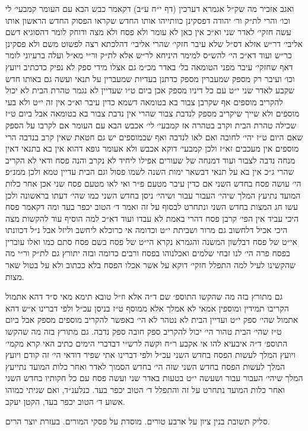 \documentclass[12pt, openany]{book}
\begin{document}
\begin{multicols}{2}
ואגב אזכיר מה שק״ל אגמרא דערכין (דף י״ח ע״ב) דקאמר כבש הבא עם העומר קמבעי׳ לי וכו׳ והרי לת״ק ור׳ יהודה דפסקינן כוותייהו אותו החדש שקראו הפסוק החדש הראשון אותו עשה חזקי׳ לאדר שני וא״כ אין כאן לא עומר ולא פסח ולא מצה ודוחק לומר דהסוגיא דשם אליבי׳ דר״ש אזלא דס״ל שלא עיבר חזקי׳ שהרי אליבי׳ דהלכתא רצה לפשוט משם ולא פסקינן כר״ש ועוד דא״כ הי׳ להש״ס למימר היניחא לר״ש אלא לת״ק ור״י מא״ל ועלה ברעיוני לומר דאף שחזקי׳ עיבר מפני הטומאה בל׳ באדר מכ״מ גם אצלו מידי ספק לא נפיק כדכתיב ויועץ וכו׳ ועיבר רק מספק שמעברין מספק כדתנן בעדיות שמעברין על תנאי ועשה גם באותו חדש שקבע לאדר שני י״ט עם כל דיניו מספק אכן ביום ט״ו שעדיין לא נגמר טהרת הבית לא יכול להקריב מוספים אף שקרבן צבור בא בטומאה דשמא כדין עיבר וא״כ אין זה י״ט ולא בעי מוספים ולא שייך שיקריב מספק לנדבת צבור שהרי אין נדבת צבור בא בטומאה אבל ביום ט״ז שכילה טהרת הבית וקרב בטהרה אז קמבעי׳ לי׳ אכבש הבא עם העומר אם לקרבו על הספק שאם היום ט״ז יהי׳ לחובה ואם לאו לנדבה ואף שבמוספים יש גם חטאת שאין קרב בנדבה הרי מוספים אין מעכבים זא״ז ולכן קמבעי׳ דוקא אכבש ולא אעומר גופא דהוא אין בא בתנאי דאין מנחה נדבה לצבור ועוד דמנחה של שעורים אפילו ליחיד לא נקרב והנה פסח ודאי לא הקריב שהרי ג״כ אין בא על תנאי דבשאר ימות השנה לשמו פסול וגם הבית עדיין טמא ולכן ממנ״פ הי׳ עושה פסח בחדש השני אם כדין עיבר מטעם פ״ר ואי לאו מטעם פסח שני אכן אחר כלות המועד נתיעץ המלך שיהי׳ העבור עבור ושיהי׳ ניסן בחדש השני כמו שהי׳ דעתו בראשונה ולכן עשו חג המצות בחדש השני ונתחרט לבסוף על זה ואמר ד׳ הטוב יכפר בעד ומה דקאמר פסח היכי עביד אין הפי׳ קרבן פסח דהרי באמת לא עבדו ועוד דא״כ למה הוסיף עוד להקשות מצה היכי אכיל דלחשוב גם מרור ושביתת י״ט וכדומה אי כרוכלא ליחשב וליזל אבל נ״ל דכוונתו אי״ט של פסח דבלשון המשנה והגמרא נקרא הי״ט של פסח בשם פסח סתם כמו ואלו עוברין בפסח פרה הי׳ לנו זבחי שלמים ואכלנוהו בפסח ורבים כדומה ובזה יתורץ גם לת״ק ור״י מה שהקשינו לעיל למה התפלל חזקי׳ דוקא על אשר אכלו הפסח בלא ככתוב ולא על בטול שאר מצות.\\\vspace{0pt}

גם מתורץ בזה מה שהקשו התוספ׳ שם ד״ה אלא וז״ל טובא תימא מאי ס״ד דהא אתמול הקריבו תמידין ומוספין אמאי לא אמלך אלא ממוסף ט״ז בניסן עכ״ל ולפי דברינו א״ש דהא אתמול שהי׳ ספק י״ט ועדיין הבית לא נטהר לא הי׳ באפשר להקריב מוספים מספק אבל ביום ט״ז שהי׳ הבית טהור הי׳ יכול להקריב ספק חובה ספק נדבה. גם מתורץ בזה מה שהקשו התוספ׳ ד״ה איבעיא להו אי אקבע ר״ח וקשה לרש״י דבדברי הימים כתיב האי קרא מקמי׳ ויועץ המלך לעשות הפסח בחדש השני עכ״ל ולפי דברינו אתי שפיר דודאי הי׳ זה קודם ויועץ המלך לעשות הפסח בחדש השני שזה הי׳ בחדש הסמוך לאדר ואחר כלות המועד נתייעץ המלך שיהי׳ העבור עבור ושעשה י״ט בטעות באדר שני ועשה פסח עם כל חקותיו בחדש השני ואחר כלות המועד נתחרט על זה והתפלל ד׳ הטוב יכפר בעד. כנלענ״ד, ואם שגיתי כמוהו אשוע ד׳ הטוב יכפר בעד, הקטן יעקב.\\\vspace{0pt}

סליק תשובת בנין ציון על ארבע טורים. מוסדת על פסקי המורים. בעזרת יוצר הרים.\\\vspace{0pt}

\end{multicols}
\newpage

\end{document}
